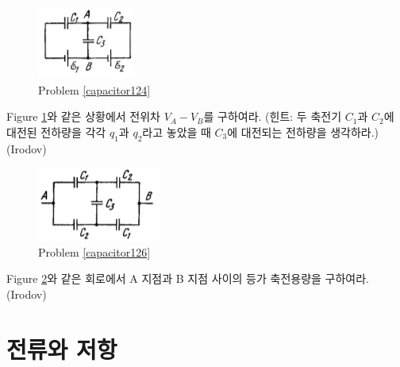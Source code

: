 \begin{problem}\label{capacitor124}
\begin{figure}[h]
\centering\includegraphics[scale=1.0]{Pictures/3.124.PNG}
\caption{Problem \ref{capacitor124}}
\label{fig:capacitor124}
\end{figure}
Figure \ref{fig:capacitor124}와 같은 상황에서 전위차 $V_A-V_B$를 구하여라. (힌트: 두 축전기 $C_1$과 $C_2$에 대전된 전하량을 각각 $q_1$과 $q_2$라고 놓았을 때 $C_3$에 대전되는 전하량을 생각하라.) (Irodov)
\end{problem}

\begin{problem}\label{capacitor126}
\begin{figure}[h]
\centering\includegraphics[scale=1.0]{Pictures/3.126.PNG}
\caption{Problem \ref{capacitor126}}
\label{fig:capacitor126}
\end{figure}
Figure \ref{fig:capacitor126}와 같은 회로에서 A 지점과 B 지점 사이의 등가 축전용량을 구하여라. (Irodov)
\end{problem}

\section{전류와 저항}
